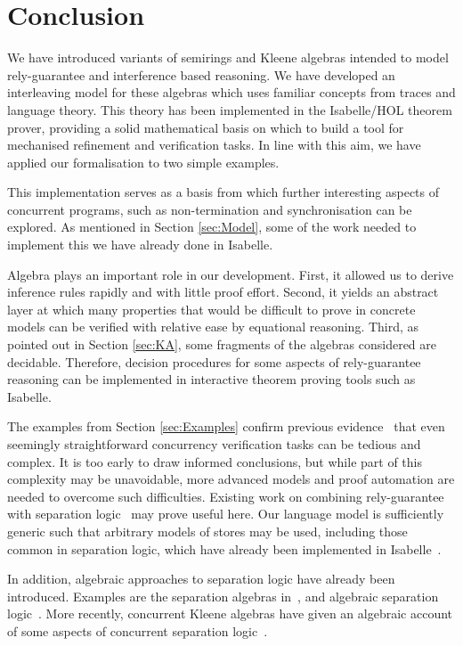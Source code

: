\documentclass{llncs}
\begin{document}
\section{Conclusion}

We have introduced variants of semirings and Kleene algebras intended
to model rely-guarantee and interference based reasoning. We have
developed an interleaving model for these algebras which uses familiar
concepts from traces and language theory. This theory has been
implemented in the Isabelle/HOL theorem prover, providing a solid
mathematical basis on which to build a tool for mechanised refinement
and verification tasks. In line with this aim, we have applied
our formalisation to two simple examples.

This implementation serves as a basis from which further interesting
aspects of concurrent programs, such as non-termination and
synchronisation can be explored. As mentioned in Section
\ref{sec:Model}, some of the work needed to implement this we have
already done in Isabelle.

Algebra plays an important role in our development. First, it
allowed us to derive inference rules rapidly and with little proof
effort. Second, it yields an abstract layer at which many properties
that would be difficult to prove in concrete models can be verified
with relative ease by equational reasoning. Third, as pointed out in
Section \ref{sec:KA}, some fragments of the algebras considered are
decidable. Therefore, decision procedures for some aspects of
rely-guarantee reasoning can be implemented in interactive theorem
proving tools such as Isabelle.

The examples from Section \ref{sec:Examples} confirm previous
evidence~\cite{nieto_rely-guarantee_2003} that even seemingly
straightforward concurrency verification tasks can be tedious and complex. It is
too early to draw informed conclusions, but while part of this complexity
may be unavoidable, more advanced models and proof automation are
needed to overcome such difficulties. Existing work on combining
rely-guarantee with separation logic~\cite{vafeiadis_modular_2008} may
prove useful here. Our language model is sufficiently generic such
that arbitrary models of stores may be used, including those common in
separation logic, which have already been implemented in Isabelle~\cite{klein_mechanised_2012}.

In addition, algebraic approaches to separation logic have already
been introduced. Examples are the separation algebras
in~\cite{calcagno_local_2007}, and algebraic separation
logic~\cite{dang_algebraic_2011}. More recently, concurrent Kleene
algebras have given an algebraic account of some aspects of concurrent
separation logic~\cite{hoare_concurrent_2011,hoare_locality_2011}.
\end{document}
